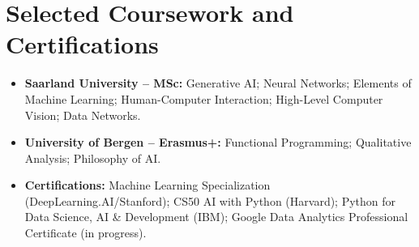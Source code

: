 \documentclass[letterpaper,11pt]{article}
\begin{document}
\section{Selected Coursework and Certifications}
\begin{itemize}[leftmargin=0.15in, label={}, itemsep=1pt, parsep=0pt]
\item{\small \textbf{Saarland University -- MSc:} Generative AI; Neural Networks; Elements of Machine Learning; Human-Computer Interaction; High-Level Computer Vision; Data Networks.}
\item{\small \textbf{University of Bergen -- Erasmus+:} Functional Programming; Qualitative Analysis; Philosophy of AI.}
\item{\small \textbf{Certifications:} Machine Learning Specialization (DeepLearning.AI/Stanford); CS50 AI with Python (Harvard); Python for Data Science, AI \& Development (IBM); Google Data Analytics Professional Certificate (in progress).}
\end{itemize}
\end{document}
